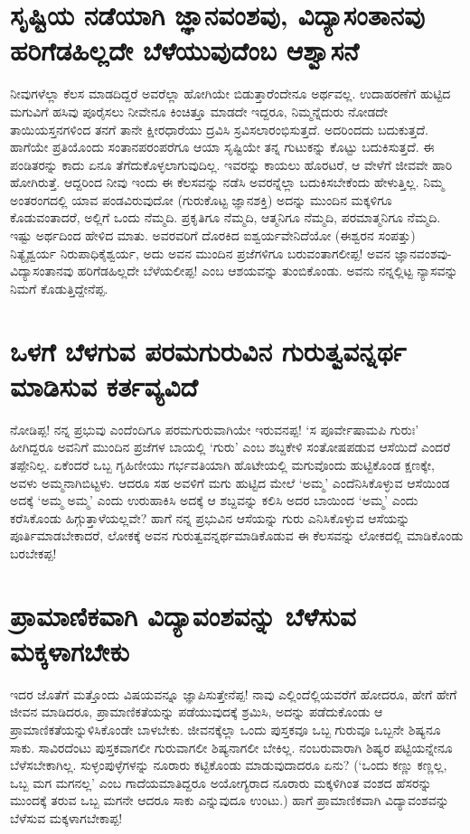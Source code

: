 \section*{ಸೃಷ್ಟಿಯ ನಡೆಯಾಗಿ ಜ್ಞಾನವಂಶವು, ವಿದ್ಯಾಸಂತಾನವು ಹರಿಗೆಡಹಿಲ್ಲದೇ ಬೆಳೆಯುವುದೆಂಬ ಆಶ್ವಾಸನೆ}

ನೀವುಗಳೆಲ್ಲಾ ಕೆಲಸ ಮಾಡದಿದ್ದರೆ ಅವರೆಲ್ಲಾ ಹೋಗಿಯೇ ಬಿಡುತ್ತಾರೆಂದೇನೂ ಅರ್ಥವಲ್ಲ. ಉದಾಹರಣೆಗೆ ಹುಟ್ಟಿದ ಮಗುವಿಗೆ ಹಸಿವು ಪೂರೈಸಲು ನೀವೇನೂ ಕಿಂಚಿತ್ತೂ ಮಾಡದೇ ಇದ್ದರೂ, ನಿಮ್ಮನ್ನೆದುರು ನೋಡದೇ ತಾಯಿಯಸ್ತನಗಳಿಂದ ತನಗೆ ತಾನೇ ಕ್ಷೀರಧಾರೆಯು ದ್ರವಿಸಿ ಸ್ರವಿಸಲಾರಂಭಿಸುತ್ತದೆ. ಅದರಿಂದದು ಬದುಕುತ್ತದೆ. ಹಾಗೆಯೇ ಪ್ರತಿಯೊಂದು ಸಂತಾನಪರಂಪರೆಗೂ ಆಯಾ ಸೃಷ್ಟಿಯೇ ತನ್ನ ಗುಟುಕನ್ನು ಕೊಟ್ಟು ಬದುಕಿಸುತ್ತದೆ. ಈ ಪಂಡಿತರನ್ನು ಕಾದು ಏನೂ ತೆಗೆದುಕೊಳ್ಳಲಾಗುವುದಿಲ್ಲ. ಇವರನ್ನು ಕಾಯಲು ಹೊರಟರೆ, ಆ ವೇಳೆಗೆ ಜೀವವೇ ಹಾರಿ ಹೋಗಿರುತ್ತೆ. ಆದ್ದರಿಂದ ನೀವು ಇಂದು ಈ ಕೆಲಸವನ್ನು ನಡೆಸಿ ಅವರನ್ನೆಲ್ಲಾ ಬದುಕಿಸಬೇಕೆಂದು ಹೇಳುತ್ತಿಲ್ಲ. ನಿಮ್ಮ ಅಂತರಂಗದಲ್ಲಿ ಯಾವ ಪಂಡವಿರುವುದೋ (ಗುರುಕೊಟ್ಟ ಜ್ಞಾನಶಕ್ತಿ) ಅದನ್ನು ಮುಂದಿನ ಮಕ್ಕಳಿಗೂ ಕೊಡುವಂತಾದರೆ, ಅಲ್ಲಿಗೆ ಒಂದು ನೆಮ್ಮದಿ. ಪ್ರಕೃತಿಗೂ ನೆಮ್ಮದಿ, ಆತ್ಮನಿಗೂ ನೆಮ್ಮದಿ, ಪರಮಾತ್ಮನಿಗೂ ನೆಮ್ಮದಿ. ಇಷ್ಟು ಅರ್ಥದಿಂದ ಹೇಳಿದ ಮಾತು. ಅವರವರಿಗೆ ದೊರಕಿದ ಐಶ್ವರ್ಯವೇನಿದೆಯೋ (ಈಶ್ವರನ ಸಂಪತ್ತು) ನಿತ್ಯೈಶ್ವರ್ಯ ನಿರುಪಾಧಿಕೈಶ್ವರ್ಯ, ಅದು ಅವನ ಮುಂದಿನ ಪ್ರಜೆಗಳಿಗೂ ಬರುವಂತಾಗಲೀಪ್ಪ! ಅವನ ಜ್ಞಾನವಂಶವು- ವಿದ್ಯಾಸಂತಾನವು ಹರಿಗೆಡಹಿಲ್ಲದೇ ಬೆಳೆಯಲೀಪ್ಪ! ಎಂಬ ಆಶಯವನ್ನು ತುಂಬಿಕೊಂಡು. ಅವನು ನನ್ನಲ್ಲಿಟ್ಟ ನ್ಯಾಸವನ್ನು ನಿಮಗೆ ಕೊಡುತ್ತಿದ್ದೇನೆಪ್ಪ.

\section*{ಒಳಗೆ ಬೆಳಗುವ ಪರಮಗುರುವಿನ ಗುರುತ್ವವನ್ನರ್ಥ ಮಾಡಿಸುವ ಕರ್ತವ್ಯವಿದೆ}

ನೋಡಿಪ್ಪ! ನನ್ನ ಪ್ರಭುವು ಎಂದೆಂದಿಗೂ ಪರಮಗುರುವಾಗಿಯೇ ಇರುವನಪ್ಪ! `ಸ ಪೂರ್ವೇಷಾಮಪಿ ಗುರುಃ' ಹೀಗಿದ್ದರೂ ಅವನಿಗೆ ಮುಂದಿನ ಪ್ರಜೆಗಳ ಬಾಯಲ್ಲಿ `ಗುರು' ಎಂಬ ಶಬ್ದಕೇಳಿ ಸಂತೋಷಪಡುವ ಆಸೆಯಿದೆ ಎಂದರೆ ತಪ್ಪೇನಿಲ್ಲ. ಏಕೆಂದರೆ ಒಬ್ಬ ಗೃಹಿಣೀಯು ಗರ್ಭವತಿಯಾಗಿ ಹೊಟೇಯಲ್ಲಿ ಮಗುವೊಂದು ಹುಟ್ಟಿಕೊಂಡ ಕ್ಷಣಕ್ಕೇ, ಅವಳು ಅಮ್ಮನಾಗಿಬಿಟ್ಟಳು. ಆದರೂ ಸಹ ಅವಳಿಗೆ ಮಗು ಹುಟ್ಟಿದ ಮೇಲೆ `ಅಮ್ಮ' ಎಂದೆನಿಸಿಕೊಳ್ಳುವ ಆಸೆಯಿಂಡ ಅದಕ್ಕೆ `ಅಮ್ಮ ಅಮ್ಮ' ಎಂದು ಉರುಹಾಕಿಸಿ ಅದಕ್ಕೆ ಆ ಶಬ್ದವನ್ನು ಕಲಿಸಿ ಅದರ ಬಾಯಿಂದ `ಅಮ್ಮ' ಎಂದು ಕರೆಸಿಕೊಂಡು ಹಿಗ್ಗುತ್ತಾಳೆಯಲ್ಲವೇ? ಹಾಗೆ ನನ್ನ ಪ್ರಭುವಿನ ಆಸೆಯನ್ನು ಗುರು ಎನಿಸಿಕೊಳ್ಳುವ ಆಸೆಯನ್ನು ಪೂರ್ತಿಮಾಡಬೇಕಾದರೆ, ಲೋಕಕ್ಕೆ ಅವನ ಗುರುತ್ವವನ್ನರ್ಥಮಾಡಿಕೊಡುವ ಈ ಕೆಲಸವನ್ನು ಲೋಕದಲ್ಲಿ ಮಾಡಿಕೊಂಡು ಬರಬೇಕಪ್ಪ!

\section*{ಪ್ರಾಮಾಣಿಕವಾಗಿ ವಿದ್ಯಾವಂಶವನ್ನು ಬೆಳೆಸುವ ಮಕ್ಕಳಾಗಬೇಕು}

ಇದರ ಜೊತೆಗೆ ಮತ್ತೊಂದು ವಿಷಯವನ್ನೂ ಜ್ಞಾಪಿಸುತ್ತೇನೆಪ್ಪ! ನಾವು ಎಲ್ಲಿಂದೆಲ್ಲಿಯವರೆಗೆ ಹೋದರೂ, ಹೇಗೆ ಹೇಗೆ ಜೀವನ ಮಾಡಿದರೂ, ಪ್ರಾಮಾಣಿಕತೆಯನ್ನು ಪಡೆಯುವುದಕ್ಕೆ ಶ್ರಮಿಸಿ, ಅದನ್ನು ಪಡೆದುಕೊಂಡು ಆ ಪ್ರಾಮಾಣಿಕತೆಯನ್ನುಳಿಸಿಕೊಂಡೇ ಬಾಳಬೇಕು. ಜೀವನಕ್ಕೆಲ್ಲಾ ಒಂದು ಪುಸ್ತಕವೂ ಒಬ್ಬ ಗುರುವೂ ಒಬ್ಬನೇ ಶಿಷ್ಯನೂ ಸಾಕು. ಸಾವಿರದೆಂಟು ಪುಸ್ತಕವಾಗಲೀ ಗುರುವಾಗಲೀ ಶಿಷ್ಯನಾಗಲೀ ಬೇಕಿಲ್ಲ. ನಂಬರುವಾರಾಗಿ ಶಿಷ್ಯರ ಪಟ್ಟಿಯನ್ನೇನೂ ಬೆಳೆಸಬೇಕಾಗಿಲ್ಲ. ಸುಳ್ಳಂಪುಳ್ಳೆಗಳನ್ನು ನೂರಾರು ಕಟ್ಟಿಕೊಂಡು ಮಾಡುವುದಾದರೂ ಏನು? (`ಒಂದು ಕಣ್ಣು ಕಣ್ಣಲ್ಲ, ಒಬ್ಬ ಮಗ ಮಗನಲ್ಲ' ಎಂಬ ಗಾದೆಯಮಾತಿದ್ದರೂ ಅಯೋಗ್ಯರಾದ ನೂರಾರು ಮಕ್ಕಳಿಗಿಂತ ವಂಶದ ಹೆಸರನ್ನು ಮುಂದಕ್ಕೆ ತರುವ ಒಬ್ಬ ಮಗನೇ ಆದರೂ ಸಾಕು ಎನ್ನುವುದೂ ಉಂಟು.) ಹಾಗೆ ಪ್ರಾಮಾಣಿಕವಾಗಿ ವಿದ್ಯಾವಂಶವನ್ನು ಬೆಳೆಸುವ ಮಕ್ಕಳಾಗಬೇಕಾಪ್ಪ!

